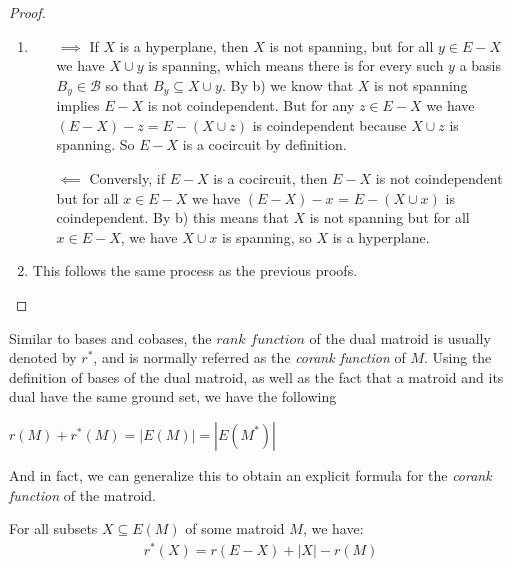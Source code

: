\begin{proof}
\begin{enumerate}
    \item  \begin{enumerate}
        \item[$\implies$] If $X$ is a hyperplane, then $X$ is not spanning, but for all $y \in E - X$ we have $X \cup y$ is spanning, which means there is for every such $y$ a basis $B_y \in \mathcal{B}$ so that $B_y \subseteq X \cup y $. By b) we know that $X$ is not spanning implies $E - X$ is not coindependent. But for any $z \in E - X$ we have $(E-X)-z = E - (X \cup z)$ is coindependent because $X \cup z$ is spanning. So $E - X$ is a cocircuit by definition.
        \item[$\impliedby$] Conversly, if $E - X$ is a cocircuit, then $E-X$ is not coindependent but for all $x \in E - X$ we have $(E - X) - x$ = $E - (X \cup x)$ is coindependent. By b) this means that $X$ is not spanning but for all $x \in E-X$, we have $X \cup x$ is spanning, so $X$ is a hyperplane.
    \end{enumerate}

\item This follows the same process as the previous proofs.
    \end{enumerate}
\end{proof}

Similar to bases and cobases, the $rank$ $ function$ of the dual matroid is usually denoted by $r^*$, and is normally referred as the \textit{corank function} of $M$. Using the definition of bases of the dual matroid, as well as the fact that a matroid and its dual have the same ground set, we have the following

\begin{theorem}\label{RankAndCorankEquation}
    $r(M) + r^*(M) = |E(M)|=|E(M^*)|$
\end{theorem}

And in fact, we can generalize this to obtain an explicit formula for the \textit{corank function} of the matroid. 

\begin{theorem}\label{rankdualequation}
    For all subsets $X \subseteq E(M)$ of some matroid $M$, we have:
    \begin{align*}
    r^*(X)=r(E-X)+|X|-r(M)
    \end{align*}
\end{theorem}

